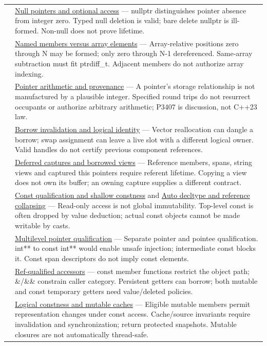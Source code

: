 {\begin{longtable}[]{@{}
  >{\raggedright\arraybackslash}p{}
  >{\raggedright\arraybackslash}p{}@{}}
118 & \hyperref[appendix-afae48c31800]{Null pointers and optional access} --- nullptr distinguishes pointer absence from integer zero. Typed null deletion is valid; bare delete nullptr is ill-formed. Non-null does not prove lifetime. \\
119 & \hyperref[appendix-3f7e15effba6]{Named members versus array elements} --- Array-relative positions zero through N may be formed; only zero through N-1 dereferenced. Same-array subtraction must fit ptrdiff\_t. Adjacent members do not authorize array indexing. \\
120 & \hyperref[appendix-6af5921bc853]{Pointer arithmetic and provenance} --- A pointer's storage relationship is not manufactured by a plausible integer. Specified round trips do not resurrect occupants or authorize arbitrary arithmetic; P3407 is discussion, not C++23 law. \\
121 & \hyperref[appendix-f9b8b9188c7f]{Borrow invalidation and logical identity} --- Vector reallocation can dangle a borrow; swap assignment can leave a live slot with a different logical owner. Valid handles do not certify previous component references. \\
122 & \hyperref[appendix-aea529eb5175]{Deferred captures and borrowed views} --- Reference members, spans, string views and captured this pointers require referent lifetime. Copying a view does not own its buffer; an owning capture supplies a different contract. \\
123 & \hyperref[appendix-c25d60fed375]{Const qualification and shallow constness} and \hyperref[appendix-5d4252a42886]{Auto decltype and reference collapsing} --- Read-only access is not global immutability. Top-level const is often dropped by value deduction; actual const objects cannot be made writable by casts. \\
124 & \hyperref[appendix-5e1a7561cd98]{Multilevel pointer qualification} --- Separate pointer and pointee qualification. int** to const int** would enable unsafe injection; intermediate const blocks it. Const span descriptors do not imply const elements. \\
125 & \hyperref[appendix-d42039b1d6f7]{Ref-qualified accessors} --- const member functions restrict the object path; \&/\&\& constrain caller category. Persistent getters can borrow; both mutable and const temporary getters need value/deleted policies. \\
126 & \hyperref[appendix-f5593256bcaf]{Logical constness and mutable caches} --- Eligible mutable members permit representation changes under const access. Cache/source invariants require invalidation and synchronization; return protected snapshots. Mutable closures are not automatically thread-safe. \\
\end{longtable}
}

